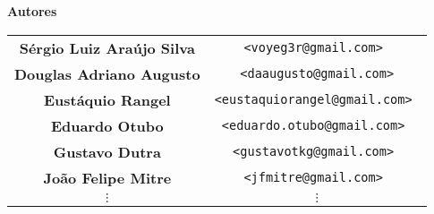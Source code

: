 \documentclass[10pt,a4paper,openany]{book}
\begin{document}
\newpage
\thispagestyle{empty}

\begin{center}
{\Huge \bf Autores}

\vspace{2cm}

\begin{tabular}{cc}

\bf Sérgio Luiz Araújo Silva & \tt <voyeg3r@gmail.com> \\
\bf Douglas Adriano Augusto & \tt <daaugusto@gmail.com>\\
\bf Eustáquio Rangel & \tt <eustaquiorangel@gmail.com> \\
\bf Eduardo Otubo & \tt <eduardo.otubo@gmail.com> \\
\bf Gustavo Dutra & \tt <gustavotkg@gmail.com> \\
\bf João Felipe Mitre & \tt <jfmitre@gmail.com> \\
$\vdots$ & $\vdots$ \\

\end{tabular}

\end{center}

\newpage
\tableofcontents

\setcounter{page}{0} %


















\fancyhf{} 
\fancyhead[LE,RO]{\bfseries\thepage}



\fancyhf{} 
\fancyhead[LE,RO]{\bfseries\thepage}
\fancyhead[LO]{\bfseries\rightmark}
\fancyhead[RE]{\bfseries\leftmark}
\appendix


\fancyhf{} 
\fancyhead[LE,RO]{\bfseries\thepage}
\printindex
\end{document}
